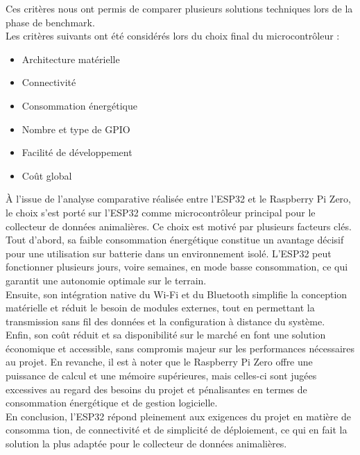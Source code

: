 Ces critères nous ont permis de comparer plusieurs solutions techniques lors de la phase de benchmark.
\\

Les critères suivants ont été considérés lors du choix final du microcontrôleur :
\begin{itemize}
    \item Architecture matérielle
    \item Connectivité
    \item Consommation énergétique
    \item Nombre et type de GPIO
    \item Facilité de développement
    \item Coût global
    \\
\end{itemize}

À l’issue de l’analyse comparative réalisée entre l’ESP32 et le Raspberry Pi Zero, le choix s’est porté sur l’ESP32 comme microcontrôleur 
principal pour le collecteur de données animalières. Ce choix est motivé par plusieurs facteurs clés. Tout d’abord, sa faible consommation
énergétique constitue un avantage décisif pour une utilisation sur batterie dans un environnement isolé. L’ESP32 peut fonctionner 
plusieurs jours, voire semaines, en mode basse consommation, ce qui garantit une autonomie optimale sur le terrain.
\\

Ensuite, son intégration native du Wi-Fi et du Bluetooth simplifie la conception matérielle et réduit le besoin de modules externes, 
tout en permettant la transmission sans fil des données et la configuration à distance du système.
\\

Enfin, son coût réduit et sa disponibilité sur le marché en font une solution économique et accessible, sans compromis majeur sur 
les performances nécessaires au projet. En revanche, il est à noter que le Raspberry Pi Zero offre une puissance de calcul et une
mémoire supérieures, mais celles-ci sont jugées excessives au regard des besoins du projet et pénalisantes en termes de consommation 
énergétique et de gestion logicielle.
\\

En conclusion, l’ESP32 répond pleinement aux exigences du projet en matière de consomma tion, de connectivité et de simplicité de 
déploiement, ce qui en fait la solution la plus adaptée pour le collecteur de données animalières.
\\

